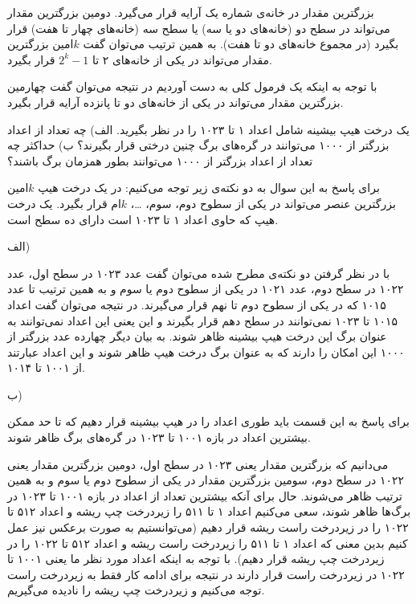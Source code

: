 بزرگترین مقدار در خانه‌ی شماره یک آرایه قرار می‌گیرد. دومین بزرگترین مقدار می‌تواند در سطح دو (خانه‌های دو یا سه) یا سطح سه (خانه‌های چهار تا هفت) قرار بگیرد (در مجموع خانه‌های دو تا هفت). به همین ترتیب می‌توان گفت {$k$}امین بزرگترین مقدار می‌تواند در یکی از خانه‌های ۲ تا {$2^k-1$} قرار بگیرد.

با توجه به اینکه یک فرمول کلی به دست آوردیم در نتیجه می‌توان گفت چهارمین بزرگترین مقدار می‌تواند در یکی از خانه‌های دو تا پانزده آرایه قرار بگیرد.

 یک درخت هیپ بیشینه شامل اعداد ۱ تا ۱۰۲۳ را در نظر بگیرید. الف) چه تعداد از اعداد بزرگتر از ۱۰۰۰ می‌توانند در گره‌های برگ چنین درختی قرار بگیرند؟ ب) حداکثر چه تعداد از اعداد بزرگتر از ۱۰۰۰ می‌توانند بطور همزمان برگ باشند؟


برای پاسخ به این سوال به دو نکته‌ی زیر توجه می‌کنیم:
 در یک درخت هیپ {$k$}امین بزرگترین عنصر می‌تواند در یکی از سطوح دوم، سوم، {\ldots}، {$k$}ام قرار بگیرد.
  یک درخت هیپ که حاوی اعداد ۱ تا ۱۰۲۳ است دارای ده سطح است.

الف)

با در نظر گرفتن دو نکته‌ی مطرح شده می‌توان گفت عدد ۱۰۲۳ در سطح اول، عدد ۱۰۲۲ در سطح دوم، عدد ۱۰۲۱ در یکی از سطوح دوم یا سوم و به همین ترتیب تا عدد ۱۰۱۵ که در یکی از سطوح دوم تا نهم قرار می‌گیرند. در نتیجه می‌توان گفت اعداد ۱۰۱۵ تا ۱۰۲۳ نمی‌توانند در سطح دهم قرار بگیرند و این یعنی این اعداد نمی‌توانند به عنوان برگ این درخت هیپ بیشینه ظاهر شوند. به بیان دیگر چهارده عدد بزرگتر از ۱۰۰۰ این امکان را دارند که به عنوان برگ درخت هیپ ظاهر شوند و این اعداد عبارتند از ۱۰۰۱ تا ۱۰۱۴.

ب)

برای پاسخ به این قسمت باید طوری اعداد را در هیپ بیشینه قرار دهیم که تا حد ممکن بیشترین اعداد در بازه ۱۰۰۱ تا ۱۰۲۳ در گره‌های برگ ظاهر شوند.

می‌دانیم که بزرگترین مقدار یعنی ۱۰۲۳ در سطح اول، دومین بزرگترین مقدار یعنی ۱۰۲۲ در سطح دوم، سومین بزرگترین مقدار در یکی از سطوح دوم یا سوم و به همین ترتیب ظاهر می‌شوند. حال برای آنکه بیشترین تعداد از اعداد در بازه ۱۰۰۱ تا ۱۰۲۳ در برگ‌ها ظاهر شوند، سعی می‌کنیم اعداد ۱ تا ۵۱۱ را زیردرخت چپ ریشه و اعداد ۵۱۲ تا ۱۰۲۲ را در زیردرخت راست ریشه قرار دهیم (می‌توانستیم به صورت برعکس نیز عمل کنیم بدین معنی که اعداد ۱ تا ۵۱۱ را زیردرخت راست ریشه و اعداد ۵۱۲ تا ۱۰۲۲ را در زیردرخت چپ ریشه قرار دهیم). با توجه به اینکه اعداد مورد نظر ما یعنی ۱۰۰۱ تا ۱۰۲۲ در زیردرخت راست قرار دارند در نتیجه برای ادامه کار فقط به زیردرخت راست توجه می‌کنیم و زیردرخت چپ ریشه را نادیده می‌گیریم. 

